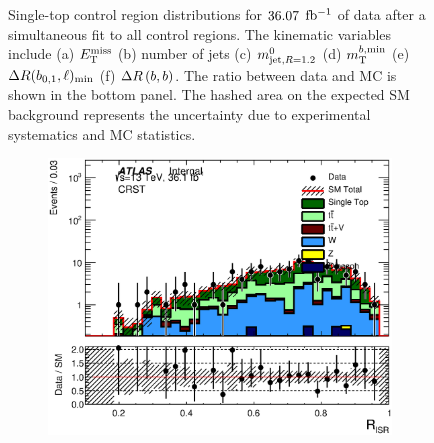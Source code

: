 \begin{figure}[h!]
\begin{center}
\end{center}
\caption[Single-top control region distributions for $\intlumi$ $\ifb$ of data after a simultaneous fit to all control regions]{Single-top control region distributions for $\intlumi$ $\ifb$ of data after a simultaneous fit to all control regions. The kinematic variables include (a) $E_{\mathrm{T}}^{\mathrm{miss}}$ (b) number of jets (c) $m^{0}_{\mathrm{jet,}R=1.2}$ (d) $m_{\mathrm{T}}^{b,\mathrm{min}}$ (e) $\Delta R(b_{0,1},\ell)_{\mathrm{min}}$ (f) $\Delta R\left(b,b\right)$. The ratio between data and MC is shown in the bottom panel. The hashed area on the expected SM background represents the uncertainty due to experimental systematics and MC statistics.}
\label{fig:CRST}
\end{figure}

\pagebreak

\begin{figure}[h!]
  \begin{center}
      \begin{subfigure}[b]{0.40\textwidth}    
    	 \includegraphics[width=\textwidth]{figures/plotRegion/CA_RISR_CRST_log.eps}
                \caption{ }
    \end{subfigure}
        \begin{subfigure}[b]{0.40\textwidth}    

\end{subfigure}
\end{center}
\end{figure}
